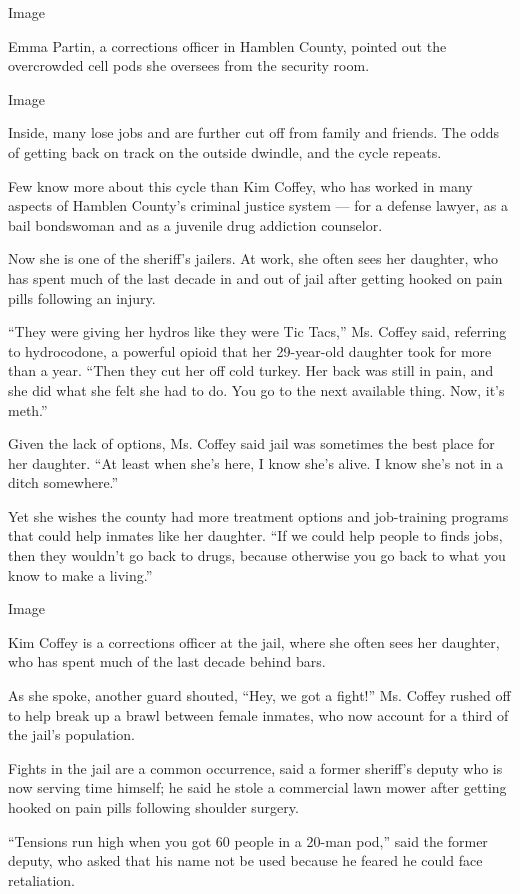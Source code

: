 Image

Emma Partin, a corrections officer in Hamblen County, pointed out the
overcrowded cell pods she oversees from the security room.

Image

Inside, many lose jobs and are further cut off from family and friends.
The odds of getting back on track on the outside dwindle, and the cycle
repeats.

Few know more about this cycle than Kim Coffey, who has worked in many
aspects of Hamblen County's criminal justice system --- for a defense
lawyer, as a bail bondswoman and as a juvenile drug addiction counselor.

Now she is one of the sheriff's jailers. At work, she often sees her
daughter, who has spent much of the last decade in and out of jail after
getting hooked on pain pills following an injury.

``They were giving her hydros like they were Tic Tacs,'' Ms. Coffey
said, referring to hydrocodone, a powerful opioid that her 29-year-old
daughter took for more than a year. ``Then they cut her off cold turkey.
Her back was still in pain, and she did what she felt she had to do. You
go to the next available thing. Now, it's meth.''

Given the lack of options, Ms. Coffey said jail was sometimes the best
place for her daughter. ``At least when she's here, I know she's alive.
I know she's not in a ditch somewhere.''

Yet she wishes the county had more treatment options and job-training
programs that could help inmates like her daughter. ``If we could help
people to finds jobs, then they wouldn't go back to drugs, because
otherwise you go back to what you know to make a living.''

Image

Kim Coffey is a corrections officer at the jail, where she often sees
her daughter, who has spent much of the last decade behind bars.

As she spoke, another guard shouted, ``Hey, we got a fight!'' Ms. Coffey
rushed off to help break up a brawl between female inmates, who now
account for a third of the jail's population.

Fights in the jail are a common occurrence, said a former sheriff's
deputy who is now serving time himself; he said he stole a commercial
lawn mower after getting hooked on pain pills following shoulder
surgery.

``Tensions run high when you got 60 people in a 20-man pod,'' said the
former deputy, who asked that his name not be used because he feared he
could face retaliation.


